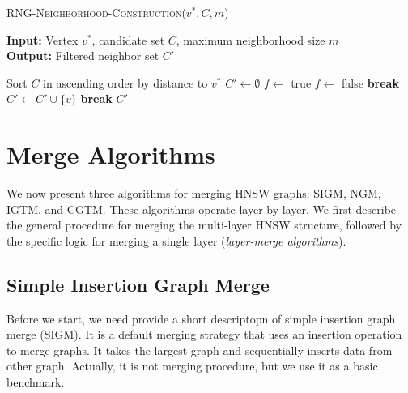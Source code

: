 \documentclass{article}
\begin{document}
\begin{algorithm}
\caption{\textsc{RNG-Neighborhood-Construction}($v^*, C, m$)}\label{alg:rngstrategy}
\textbf{Input:} Vertex $v^*$, candidate set $C$, maximum neighborhood size $m$ \\
\textbf{Output:} Filtered neighbor set $C'$
\begin{algorithmic}[1]
\State Sort $C$ in ascending order by distance to $v^*$
\State $C' \gets \emptyset$
    \State $f \gets$ true
            \State $f \gets$ false
            \State \textbf{break}
        \EndIf
    \EndFor
        \State $C' \gets C' \cup \{v\}$
    \EndIf
        \State \textbf{break}
    \EndIf
\EndFor
\State \Return $C'$
\end{algorithmic}
\end{algorithm}

\section{Merge Algorithms}
\label{sec:merge}

We now present three algorithms for merging HNSW graphs: \textsc{SIGM},  \textsc{NGM}, \textsc{IGTM}, and \textsc{CGTM}. These algorithms operate layer by layer. We first describe the general procedure for merging the multi-layer HNSW structure, followed by the specific logic for merging a single layer (\textit{layer-merge algorithms}).

\subsection{Simple Insertion Graph Merge}
Before we start, we need provide a short descriptopn of simple insertion graph merge (SIGM). It is a default merging strategy that uses an insertion operation to merge graphs. It takes the largest graph and sequentially inserts data from other graph. Actually, it is not merging procedure, but we use it as a basic benchmark.
\end{document}
